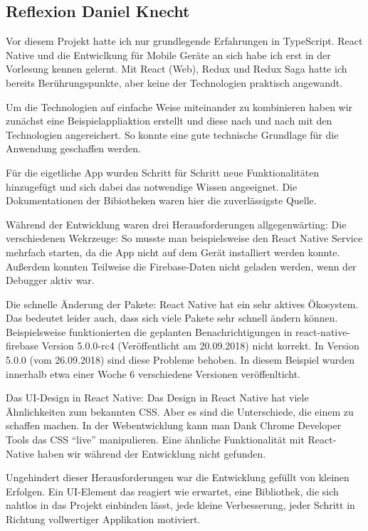 \subsection{Reflexion Daniel Knecht}
Vor diesem Projekt hatte ich nur grundlegende Erfahrungen in TypeScript.
React Native und die Entwiclkung für Mobile Geräte an sich habe ich erst in der Vorlesung kennen gelernt.
Mit React (Web), Redux und Redux Saga hatte ich bereits Berührungspunkte,
aber keine der Technologien praktisch angewandt.

Um die Technologien auf einfache Weise miteinander zu kombinieren haben wir zunächst eine
Beispielappliaktion erstellt und diese nach und nach mit den Technologien angereichert.
So konnte eine gute technische Grundlage für die Anwendung geschaffen werden.

Für die eigetliche App wurden Schritt für Schritt neue Funktionalitäten hinzugefügt
und sich dabei das notwendige Wissen angeeignet.
Die Dokumentationen der Bibiotheken waren hier die zuverlässigste Quelle.

Während der Entwicklung waren drei Herausforderungen allgegenwärting:
Die verschiedenen Wekrzeuge: So musste man beispielsweise den React Native Service mehrfach starten,
da die App nicht auf dem Gerät installiert werden konnte.
Außerdem konnten Teilweise die Firebase-Daten nicht geladen werden,
wenn der Debugger aktiv war.

Die schnelle Änderung der Pakete:
React Native hat ein sehr aktives Ökosystem.
Das bedeutet leider auch,
dass sich viele Pakete sehr schnell ändern können.
Beispielsweise funktionierten die geplanten Benachrichtigungen in react-native-firebase Version 5.0.0-rc4 (Veröffentlicht am 20.09.2018) nicht korrekt.
In Version 5.0.0 (vom 26.09.2018) sind diese Probleme behoben. In diesem Beispiel wurden innerhalb etwa einer Woche 6 verschiedene Versionen veröffenlticht.

Das UI-Design in React Native:
Das Design in React Native hat viele Ähnlichkeiten zum bekannten CSS.
Aber es sind die Unterschiede, die einem zu schaffen machen.
In der Webentwicklung kann man Dank Chrome Developer Tools das CSS \enquote{live} manipulieren.
Eine ähnliche Funktionalität mit React-Native haben wir während der Entwicklung nicht gefunden.

Ungehindert dieser Herausforderungen war die Entwicklung gefüllt von kleinen Erfolgen.
Ein UI-Element das reagiert wie erwartet,
eine Bibliothek, die sich nahtlos in das Projekt einbinden lässt,
jede kleine Verbesserung, jeder Schritt in Richtung vollwertiger Applikation motiviert.

